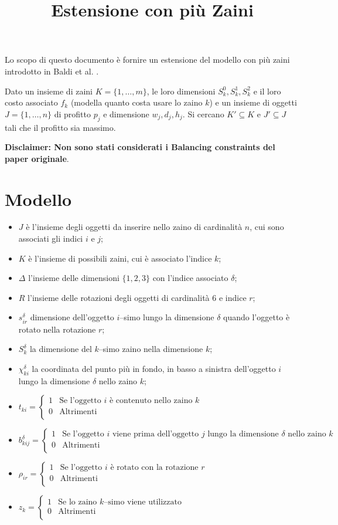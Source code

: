 \documentclass{scrartcl}
\title{Estensione con più Zaini}
\newcommand{\MutliLineEquation}[3]{ 
	\ensuremath{
		#1 = \left\{
		\begin{array}{ll}
		1& \text{#2} \\
		0& \text{#3} \\
		\end{array}
		\right.
	}
}
\begin{document}
\maketitle
Lo scopo di questo documento è fornire un estensione del modello con più zaini introdotto in Baldi et al. \cite{Baldi20129802}.

Dato un insieme di zaini $K = \{1, \dots, m\}$, le loro dimensioni $S_k^0, S_k^1, S_k^2$ e il loro costo associato $f_k$ (modella quanto costa usare lo zaino $k$) e un insieme di oggetti $J = \{1, \dots, n\}$ di profitto $p_j$ e dimensione $w_j, d_j, h_j$.
Si cercano $K' \subseteq K$ e $J' \subseteq J$ tali che il profitto sia massimo.


\textbf{Disclaimer: Non sono stati considerati i Balancing constraints del paper originale}.

\section{Modello}
\begin{itemize}
	\item $J$ è l'insieme degli oggetti da inserire nello zaino di cardinalità $n$, cui sono associati gli indici $i$ e $j$;
	\item $K$ è l'insieme di possibili zaini, cui è associato l'indice $k$;
	\item $\Delta$ l'insieme delle dimensioni $\{1,2,3\}$ con l'indice associato $\delta$;
	\item $R$ l'insieme delle rotazioni degli oggetti di cardinalità $6$ e indice $r$;
	\item $s_{ir}^\delta$ dimensione dell'oggetto $i$--simo lungo la dimensione $\delta$ quando l'oggetto è rotato nella rotazione $r$;
	\item $S_{k}^\delta$ la dimensione del $k$--simo zaino nella dimensione $k$;
	\item $\chi_{ki}^\delta$ la coordinata del punto più in fondo, in basso a sinistra dell'oggetto $i$ lungo la dimensione $\delta$ nello zaino $k$;
	\item \MutliLineEquation{t_{ki}}{Se l'oggetto $i$ è contenuto nello zaino $k$}{Altrimenti}
	\item \MutliLineEquation{b_{kij}^\delta}{Se l'oggetto $i$ viene prima dell'oggetto $j$ lungo la dimensione $\delta$ nello zaino $k$}{Altrimenti}
	\item \MutliLineEquation{\rho_{ir}}{Se l'oggetto $i$ è rotato con la rotazione $r$}{Altrimenti}
	\item \MutliLineEquation{z_k}{Se lo zaino $k$--simo viene utilizzato}{Altrimenti}
	
\end{itemize}
\end{document}
